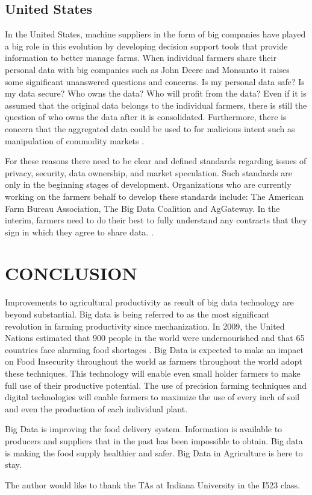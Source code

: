 \documentclass[sigconf]{acmart}
\begin{document}
\subsection {United States}

In the United States, machine suppliers in the form of big companies have played a big role in this evolution by developing decision support tools that provide information to better manage farms.  When individual farmers share their personal data with big companies such as John Deere and Monsanto it raises some significant unanswered questions and concerns. Is my personal data safe? Is my data secure? Who owns the data? Who will profit from the data? \cite{www-google-Crop}Even if  it is assumed that the original data belongs to the individual farmers, there is still the question of who owns the data after it is consolidated. Furthermore, there is concern that the aggregated data could be used to for malicious intent such as manipulation of commodity markets \cite{Wolfert}. 

For these reasons there need to be clear and defined standards regarding issues of privacy, security, data ownership, and market speculation. Such standards are only in the beginning stages of development. Organizations who are currently working on the farmers behalf to develop these standards include: The American Farm Bureau Association, The Big Data Coalition and AgGateway. In the interim, farmers need to do their best to fully understand any contracts that they sign in which they agree to share data.   \cite{Wolfert}.

\section{CONCLUSION}

Improvements to agricultural productivity as result of big data technology are beyond substantial.  Big data is being referred to as the most significant revolution in farming productivity since mechanization.  In 2009, the United Nations estimated that 900 people in the world were undernourished and that 65 countries face alarming food shortages \cite{DevEcon}. Big Data is expected to make an impact on Food Insecurity throughout the world as farmers throughout the world adopt these techniques. This technology will enable even small holder farmers to make full use of their productive potential. The use of precision farming techniques and digital technologies will enable farmers to maximize the use of every inch of soil and even the production of each individual plant.

Big Data is improving the food delivery system. Information is available to producers and suppliers that in the past has been impossible to obtain. Big data is making the food supply healthier and safer. Big Data in Agriculture is here to stay. 

 
\begin{acks}

  The author would like to thank the TAs at Indiana University in the I523 class.

\end{acks}


 
\end{document}
